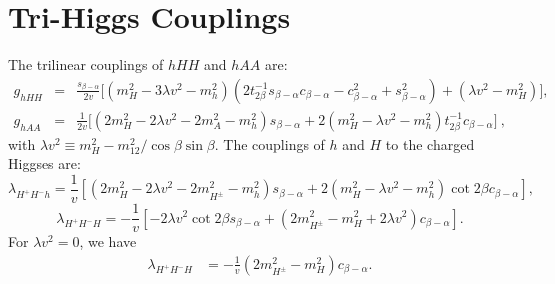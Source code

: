 \documentclass[letterpaper,11pt]{article}
\begin{document}
{\section{Tri-Higgs Couplings\label{Appx:trihiggs}}
  The trilinear couplings of $hHH$ and $hAA$ are: 
%
\begin{eqnarray}
g_{hHH}  &= &\frac{s_{\beta-\alpha}}{2v}\biggl[
(m_{H}^2 - 3\lambda v^2-m_h^2) ( 2 t_{2\beta}^{-1} s_{\beta-\alpha}c_{\beta-\alpha}  - c_{\beta-\alpha}^2 +s^2_{\beta-\alpha}) 
 + (\lambda v^2-m_H^2 ) 
\biggr],\label{eq:ghHH}\\
g_{hAA} 
&=&\frac{1}{2v}\biggl[(2 m_H^2 - 2 \lambda v^2 -2m_{A}^2-m_h^2)s_{\beta-\alpha}+2(m_H^2 - \lambda v^2-m_h^2)t_{2\beta}^{-1} c_{\beta-\alpha}\biggr] \ ,
\label{eq:ghAA}
\end{eqnarray}
with $\lambda v^2\equiv m_H^2-m_{12}^2/\cos\beta\sin\beta$.
The couplings of $h$ and $H$ to the charged Higgses are:
\begin{equation}
\lambda_{H^{+} H^{-} h} =\frac{1}{v}\left[\left(2 m_H^{2}-2 \lambda v^2 - 2 m_{H^{\pm}}^{2}-m_{h}^{2}\right) s_{\beta-\alpha}+2\left(m_H^{2}-\lambda v^2 - m_{h}^{2}\right) \cot 2 \beta c_{\beta-\alpha}\right], 
\end{equation}
\begin{equation}
\lambda_{H^{+} H^{-} H}=-\frac{1}{v}\left[-2 \lambda v^2  \cot 2 \beta s_{\beta-\alpha}+\left(2 m_{H^{\pm}}^{2}-m_{H}^{2}+2\lambda v^2 \right) c_{\beta-\alpha}\right].
\end{equation}
For $\lambda v^2=0$, we have
\begin{equation}
\begin{aligned}
\lambda_{H^{+} H^{-} H}&=-\frac{1}{v}\left(2 m_{H^{\pm}}^{2}-m_{H}^{2}\right) c_{\beta-\alpha}.
% 
\label{eq:coup_HCC}
\end{aligned}
\end{equation}
  
 
}
\end{document}
